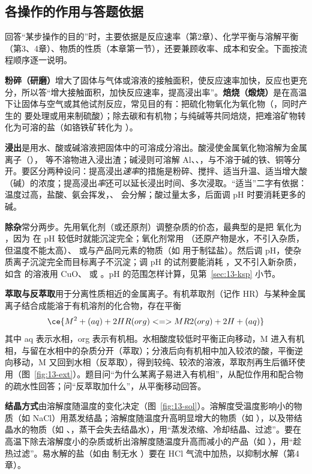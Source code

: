\documentclass[UTF8,a4paper,zihao=5,oneside,openany,fontset=none]{ctexbook}
\begin{document}
\subsection{各操作的作用与答题依据}
回答“某步操作的目的”时，主要依据是反应速率（第2章）、化学平衡与溶解平衡（第3、4章）、物质的性质（本章第一节），还要兼顾收率、成本和安全。下面按流程顺序逐一说明。

\textbf{粉碎（研磨）}增大了固体与气体或溶液的接触面积，使反应速率加快，反应也更充分，所以答“增大接触面积，加快反应速率，提高浸出率”。\textbf{焙烧（煅烧）}是在高温下让固体与空气或其他试剂反应，常见目的有：把硫化物氧化为氧化物（，同时产生的  要处理或用来制硫酸）；除去碳和有机物；与纯碱等共同焙烧，把难溶矿物转化为可溶的盐（如铬铁矿转化为 ）。

\textbf{浸出}是用水、酸或碱溶液把固体中的可溶成分溶出。酸浸使金属氧化物溶解为金属离子（）， 等不溶物进入浸出渣；碱浸则可溶解 Al、、，与不溶于碱的铁、铜等分开。要区分两种设问：提高浸出\emph{速率}的措施是粉碎、搅拌、适当升温、适当增大酸（碱）的浓度；提高浸出\emph{率}还可以延长浸出时间、多次浸取。“适当”二字有依据：温度过高，盐酸、氨会挥发，、 会分解；酸过量太多，后面调 pH 时要消耗更多的碱。

\textbf{除杂}常分两步。先用氧化剂（或还原剂）调整杂质的价态，最典型的是把  氧化为 ，因为  在 pH 较低时就能沉淀完全；氧化剂常用 （还原产物是水，不引入杂质，但温度不能太高）、 或与产品同元素的物质（如  用于制锰盐）。然后调 pH，使杂质离子沉淀完全而目标离子不沉淀；调 pH 的试剂要能消耗 ，又不引入新杂质，如含  的溶液用 CuO、 或 。pH 的范围怎样计算，见第~\ref{sec:13-ksp} 小节。

\textbf{萃取与反萃取}用于分离性质相近的金属离子。有机萃取剂（记作 HR）与某种金属离子结合成能溶于有机溶剂的化合物，存在平衡
\[\ce{M^2+(aq) + 2HR(org) <=> MR2(org) + 2H+(aq)}\]
其中 aq 表示水相，org 表示有机相。水相酸度较低时平衡正向移动，M 进入有机相，与留在水相中的杂质分开（萃取）；分液后向有机相中加入较浓的酸，平衡逆向移动，M 又回到水相（反萃取），得到较纯、较浓的溶液，萃取剂再生后循环使用（图~\ref{fig:13-ext}）。题目问“为什么某离子易进入有机相”，从配位作用和配合物的疏水性回答；问“反萃取加什么”，从平衡移动回答。

\textbf{结晶方式}由溶解度随温度的变化决定（图~\ref{fig:13-sol}）。溶解度受温度影响小的物质（如 NaCl）用蒸发结晶；溶解度随温度升高明显增大的物质（如 ），以及带结晶水的物质（如 、，蒸干会失去结晶水），用“蒸发浓缩、冷却结晶、过滤”。要在高温下除去溶解度小的杂质或析出溶解度随温度升高而减小的产品（如 ），用“趁热过滤”。易水解的盐（如由  制无水 ）要在 HCl 气流中加热，以抑制水解（第4章）。
\end{document}
